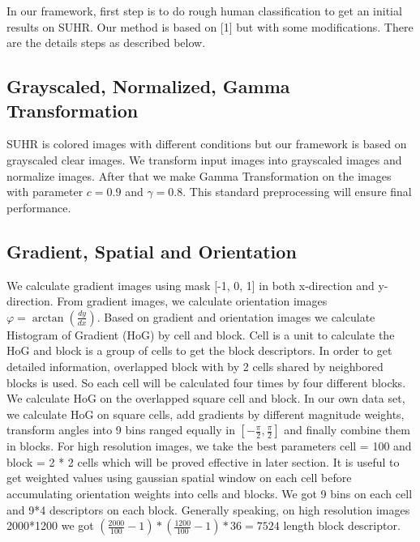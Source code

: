 \documentclass[10pt,twocolumn,letterpaper]{article}
\begin{document}
In our framework, first step is to do rough human classification to get an initial results on SUHR. Our method is based on [1] but with some modifications. There are the details steps as described below.

\subsection{Grayscaled, Normalized, Gamma Transformation}

SUHR is colored images with different conditions but our framework is based on grayscaled clear images. We transform input images into grayscaled images and normalize images. After that we make Gamma Transformation on the images with parameter $c=0.9$ and $\gamma=0.8$.
This standard preprocessing will ensure final performance. 

\subsection{Gradient, Spatial and Orientation}

We calculate gradient images using mask [-1, 0, 1] in both x-direction and y-direction. From gradient images, we calculate orientation images $\varphi=\arctan(\frac{dy}{dx})$. Based on gradient and orientation images we calculate Histogram of Gradient (HoG) by cell and block. Cell is a unit to calculate the HoG and block is a group
of cells to get the block descriptors. In order to get detailed information, overlapped block with by 2 cells shared by neighbored blocks is used. So each cell will be calculated four times by four different blocks.
We calculate HoG on the overlapped square cell and block.
In our own data set, we calculate HoG on square cells, add gradients by different magnitude weights, transform angles into 9 bins ranged equally in $[-\frac{\pi}{2}, \frac{\pi}{2}]$ and finally combine them in blocks. For high resolution images, we take the best parameters cell = 100 and block = 2 * 2 cells which will be proved effective in later section. It is useful to get weighted values using gaussian spatial window on each cell before accumulating orientation weights into cells and blocks. We got 9 bins on each cell and 9*4 descriptors on each block. Generally speaking, on high resolution images 2000*1200 we got $(\frac{2000}{100}-1)*(\frac{1200}{100}-1)*36=7524$ length block descriptor.
\end{document}
